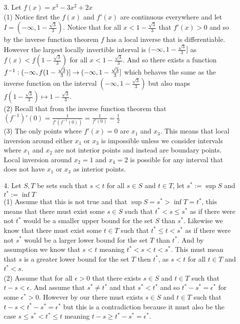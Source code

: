 \documentclass[12pt]{amsart}
\begin{document}
\begin{itemize}
   \item[3.] Let $f(x)=x^3-3x^2+2x$\\ %
      (1) Notice first the $f(x)$ and $f'(x)$ are continuous everywhere and let
      $I=(-\infty, 1-\frac{\sqrt{3}}{3})$. Notice that for all $x<1-\frac{\sqrt{3}}{3}$ that $f'(x)>0$ and so
      by the inverse function theorem $f$ has a local inverse that is differentiable.
      However the largest locally invertible interval is $(-\infty, 1-\frac{\sqrt{3}}{3}]$
      as $f(x)<f(1-\frac{\sqrt{3}}{3})$ for all $x<1-\frac{\sqrt{3}}{3}$. And so there
      exists a function $f^{-1}:(-\infty,f(1-\frac{\sqrt{3}}{3})]\rightarrow(-\infty,1-\frac{\sqrt{3}}{3}]$ 
      which behaves the same as the inverse function on the interval $(-\infty, 1-\frac{\sqrt{3}}{3})$ but also maps
      $f(1-\frac{\sqrt{3}}{3})\mapsto 1-\frac{\sqrt{3}}{3}$.\\
      (2) Recall that from the inverse function theorem that $(f^{-1})'(0)=\frac{1}{f'(f^{-1}(0))}=\frac{1}{f'(0)}=\frac{1}{2}$\\
      (3) The only points where $f'(x)=0$ are $x_1$ and $x_3$. This means that local
      inversion around either $x_1$ or $x_3$ is impossible unless we consider intervals where
      $x_1$ and $x_2$ are not interior points and instead are boundary points.
      Local inversion around $x_2=1$ and $x_4=2$ is possible for any interval that does
      not have $x_1$ or $x_3$ as interior points. %


   \item[4.] Let $S,T$ be sets such that $s<t$ for all $s\in S$ and $t\in T$, let $s^*:=\sup S$ and $t^*:=\inf T$\\
      (1) Assume that this is not true and that $\sup S=s^*> \inf T=t^*$,
      this means that there must exist some $s\in S$ such that $t^*<s\leq s^*$ as if there were not $t^*$ would be a
      smaller upper bound for the set $S$ than $s^*$. Likewise we know that there must exist
      some $t\in T$ such that $t^*\leq t< s^*$ as if there were not $s^*$ would be a
      larger lower bound for the set $T$ than $t^*$. And by assumption we know that $s<t$ meaning
      $t^*<s<t<s^*$. This must mean that $s$ is a greater lower bound for the set $T$ then $t^*$, as $s<t$
      for all $t\in T$ and $t^*<s$.\\
      (2) Assume that for all $\epsilon>0$ that there exists $s\in S$ and $t\in T$ such that $t-s<\epsilon$. 
      And assume that $s^*\neq t^*$ and that $s^*<t^*$ and so $t^*-s^*=\epsilon^*$ for some $\epsilon^*>0$.
       However by our there must exists $s\in S$ and $t\in T$ such that $t-s<t^*-s^*=\epsilon^*$ but this is a
      contradiction because it must also be the case $s\leq s^*<t^*\leq t$ meaning $t-s\geq t^*-s^*=\epsilon^*$.

\end{itemize}
\end{document}
